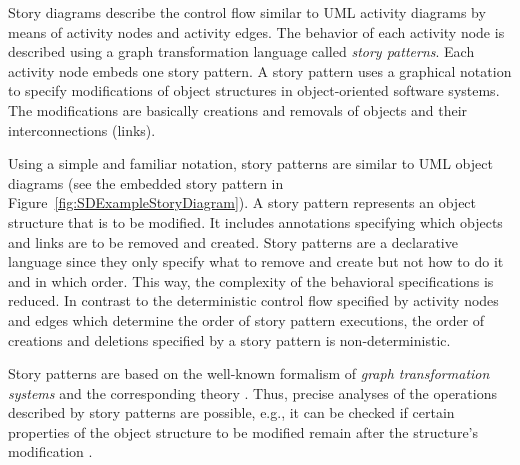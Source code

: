 Story diagrams describe the control flow similar to UML activity diagrams by means of activity nodes and activity edges.
The behavior of each activity node is described using a graph transformation language called \emph{story patterns}.
Each activity node embeds one story pattern.
A story pattern uses a graphical notation to specify modifications of object structures in object-oriented software systems.
The modifications are basically creations and removals of objects and their interconnections (links).


Using a simple and familiar notation, story patterns are similar to UML object diagrams (see the embedded story pattern in Figure~\ref{fig:SDExampleStoryDiagram}).
A story pattern represents an object structure that is to be modified.
It includes annotations specifying which objects and links are to be removed and created.
Story patterns are a declarative language since they only specify what to remove and create but not how to do it and in which order.
This way, the complexity of the behavioral specifications is reduced.
In contrast to the deterministic control flow specified by activity nodes and edges which determine the order of story pattern executions,
the order of creations and deletions specified by a story pattern is non-deterministic.


Story patterns are based on the well-known formalism of \emph{graph transformation systems} and the corresponding theory \cite{Roz97}.
Thus, precise analyses of the operations described by story patterns are possible,
e.g., it can be checked if certain properties of the object structure to be modified remain after the structure's modification \cite{Sch06,Mey09}.


